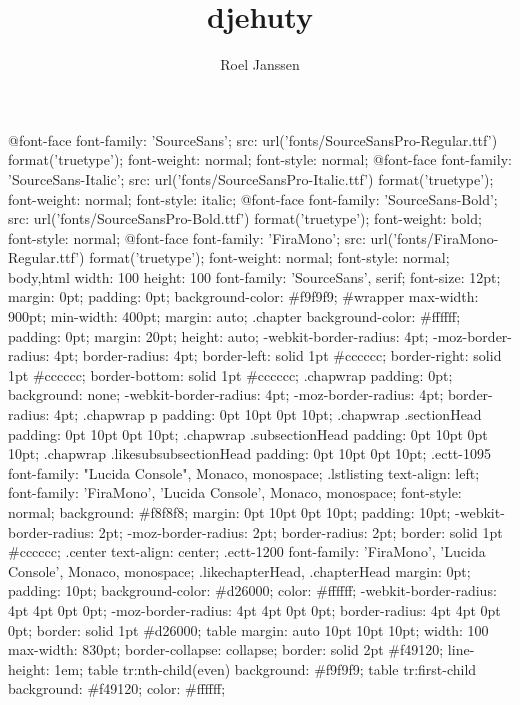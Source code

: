\documentclass[12pt,a4paper]{book}
\title{djehuty}
\author{Roel Janssen}
\begin{document}
\ifdefined\HCode
{} {\NoFonts\hfill\break} {\EndNoFonts}
\CssFile
@font-face {
    font-family: 'SourceSans';
    src: url('fonts/SourceSansPro-Regular.ttf') format('truetype');
    font-weight: normal;
    font-style: normal;
}
@font-face {
    font-family: 'SourceSans-Italic';
    src: url('fonts/SourceSansPro-Italic.ttf') format('truetype');
    font-weight: normal;
    font-style: italic;
}
@font-face {
    font-family: 'SourceSans-Bold';
    src: url('fonts/SourceSansPro-Bold.ttf') format('truetype');
    font-weight: bold;
    font-style: normal;
}
@font-face {
    font-family: 'FiraMono';
    src: url('fonts/FiraMono-Regular.ttf') format('truetype');
    font-weight: normal;
    font-style: normal;
}
body,html{
  width: 100%
  height: 100%
  font-family: 'SourceSans', serif;
  font-size: 12pt;
  margin: 0pt;
  padding: 0pt;
  background-color: #f9f9f9;
}
#wrapper {
  max-width: 900pt;
  min-width: 400pt;
  margin: auto;
}
.chapter {
  background-color: #ffffff;
  padding: 0pt;
  margin: 20pt;
  height: auto;
  -webkit-border-radius: 4pt;
  -moz-border-radius: 4pt;
  border-radius: 4pt;
  border-left: solid 1pt #cccccc;
  border-right: solid 1pt #cccccc;
  border-bottom: solid 1pt #cccccc;
}
.chapwrap {
  padding: 0pt;
  background: none;
  -webkit-border-radius: 4pt;
  -moz-border-radius: 4pt;
  border-radius: 4pt;
}
.chapwrap p { padding: 0pt 10pt 0pt 10pt; }
.chapwrap .sectionHead { padding: 0pt 10pt 0pt 10pt; }
.chapwrap .subsectionHead { padding: 0pt 10pt 0pt 10pt; }
.chapwrap .likesubsubsectionHead { padding: 0pt 10pt 0pt 10pt; }
.ectt-1095 { font-family: "Lucida Console", Monaco, monospace; }
.lstlisting {
  text-align: left;
  font-family: 'FiraMono', 'Lucida Console', Monaco, monospace;
  font-style: normal;
  background: #f8f8f8;
  margin: 0pt 10pt 0pt 10pt;
  padding: 10pt;
  -webkit-border-radius: 2pt;
  -moz-border-radius: 2pt;
  border-radius: 2pt;
  border: solid 1pt #cccccc;
}
.center { text-align: center; }
.ectt-1200 {
  font-family: 'FiraMono', 'Lucida Console', Monaco, monospace;
}
.likechapterHead, .chapterHead {
  margin: 0pt;
  padding: 10pt;
  background-color: #d26000;
  color: #ffffff;
  -webkit-border-radius: 4pt 4pt 0pt 0pt;
  -moz-border-radius: 4pt 4pt 0pt 0pt;
  border-radius: 4pt 4pt 0pt 0pt;
  border: solid 1pt #d26000;
}
table {
  margin: auto 10pt 10pt 10pt;
  width: 100%
  max-width: 830pt;
  border-collapse: collapse;
  border: solid 2pt #f49120;
  line-height: 1em;
}
table tr:nth-child(even) { background: #f9f9f9; }
table tr:first-child { background: #f49120; color: #ffffff; }
\end{document}
